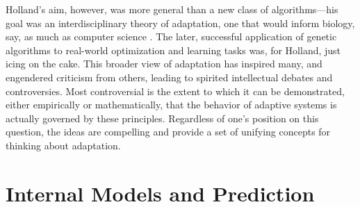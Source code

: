 \documentclass{sig-alternate}
\begin{document}
Holland's aim, however, was
more general than a new class of algorithms---his goal was an
interdisciplinary theory of adaptation, one that would inform biology, 
say, as much as computer science \cite{Christiansen1998}.  The later, successful application of
genetic algorithms to real-world optimization and learning tasks was,
for Holland, just icing on the cake.  
This broader view of adaptation
has inspired many, and engendered criticism
from others, leading to spirited intellectual debates and
controversies.  Most controversial is the extent to which it can be
demonstrated, either empirically or mathematically, that the behavior
of adaptive systems is actually governed by these principles.
Regardless of one's position on this question, the ideas are compelling
and provide a set of unifying concepts for thinking about adaptation.







\section{Internal Models and Prediction}

\end{document}

